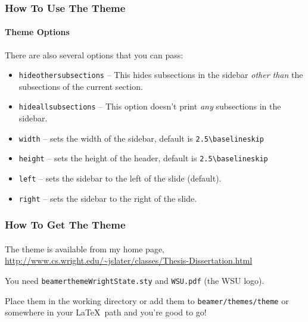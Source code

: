 \documentclass{beamer}
\begin{document}
\begin{frame}[fragile]
    \frametitle{How To Use The Theme}
    \framesubtitle{Theme Options}
        
    There are also several options that you can pass:
    \begin{itemize}
      \item \texttt{hideothersubsections} -- This hides subsections in the 
            sidebar \emph{other than} the subsections of the current section.
      \item \texttt{hideallsubsections} -- This option doesn't print \emph{any}
            subsections in the sidebar.
      \item \texttt{width} -- sets the width of the sidebar, default is 
      	    \verb"2.5\baselineskip"
      \item \texttt{height} -- sets the height of the header, default is 
      	    \verb"2.5\baselineskip"
      \item \texttt{left} -- sets the sidebar to the left of the slide (default).
      \item \texttt{right} -- sets the sidebar to the right of the slide.
    \end{itemize}
    
\end{frame}

\begin{frame}
    \frametitle{How To Get The Theme}
    \framesubtitle{}
    
    The theme is available from my home page,
    \textcolor{blue}{\url{http://www.cs.wright.edu/~jslater/classes/Thesis-Dissertation.html}}
    

    You need \texttt{beamerthemeWrightState.sty} and \texttt{WSU.pdf}
    (the WSU logo).
    
    Place them in the working directory or add them to \texttt{beamer/themes/theme}
    or somewhere in your \LaTeX\ path and you're good to go!
    
\end{frame}
    
\end{document}
